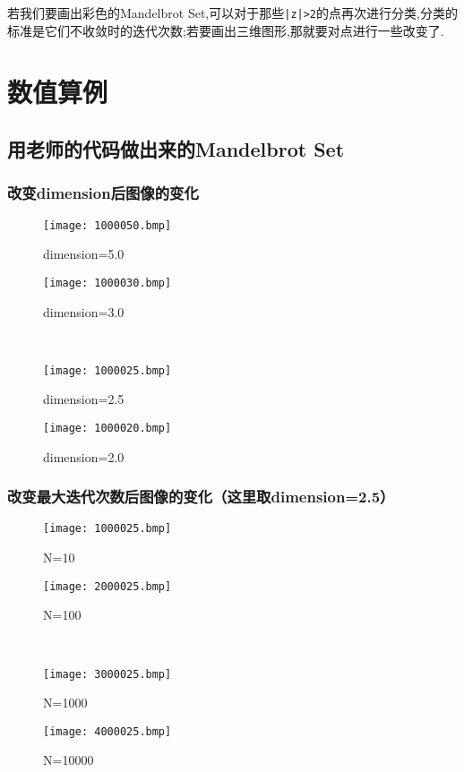 \documentclass[a4paper]{ctexart}
\begin{document}
若我们要画出彩色的Mandelbrot Set,可以对于那些\verb!|z|>2!的点再次进行分类,分类的标准是它们不收敛时的迭代次数;若要画出三维图形,那就要对点进行一些改变了.
\section{数值算例}
\subsection{用老师的代码做出来的Mandelbrot Set}
\subsubsection{改变dimension后图像的变化}
\begin{figure}[H]
\centering
\begin{minipage}{0.45\textwidth}
\centerline{\texttt{[image: 1000050.bmp]}}
\centerline{dimension=5.0}
\end{minipage}
\begin{minipage}{0.45\textwidth}
\centerline{\texttt{[image: 1000030.bmp]}}
\centerline{dimension=3.0}
\end{minipage}
\\
\begin{minipage}{0.45\textwidth}
\centerline{\texttt{[image: 1000025.bmp]}}
\centerline{dimension=2.5}
\end{minipage}
\begin{minipage}{0.45\textwidth}
\centerline{\texttt{[image: 1000020.bmp]}}
\centerline{dimension=2.0}
\end{minipage}
\end{figure}
\subsubsection{改变最大迭代次数后图像的变化（这里取dimension=2.5）}
\begin{figure}[H]
\centering
\begin{minipage}{0.45\textwidth}
\centerline{\texttt{[image: 1000025.bmp]}}
\centerline{N=10}
\end{minipage}
\begin{minipage}{0.45\textwidth}
\centerline{\texttt{[image: 2000025.bmp]}}
\centerline{N=100}
\end{minipage}
\\
\begin{minipage}{0.45\textwidth}
\centerline{\texttt{[image: 3000025.bmp]}}
\centerline{N=1000}
\end{minipage}
\begin{minipage}{0.45\textwidth}
\centerline{\texttt{[image: 4000025.bmp]}}
\centerline{N=10000}
\end{minipage}
\end{figure}
\end{document}

